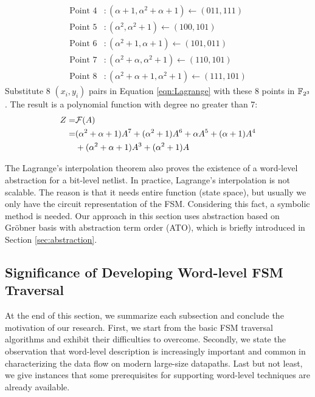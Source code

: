 \begin{Example}
\begin{align*}
\text{Point }4&:  (\alpha + 1,\alpha^2 + \alpha + 1)\gets (011,111) \\
\text{Point }5&:  (\alpha^2,\alpha^2+1) \gets (100,101)\\
\text{Point }6&:  (\alpha^2 + 1,\alpha+1)\gets (101,011)\\
\text{Point }7&:  (\alpha^2 + \alpha,\alpha^2 + 1)\gets (110,101)\\
\text{Point }8&:  (\alpha^2 + \alpha + 1,\alpha^2 + 1)\gets (111,101)
\end{align*}
Substitute 8 $(x_i,y_i)$ pairs in Equation \ref{eqn:Lagrange} with these 8 points in ${\mathbb{F}}_{2^3}$.
The result is a polynomial function with degree no greater than 7:
\begin{align*}
Z =& {\mathcal{F}}(A) \\
=& (\alpha^2+\alpha+1) A^7 + (\alpha^2+1) A^6 + \alpha A^5 + (\alpha+1) A^4 \\
&+ (\alpha^2+\alpha+1)A^3+ (\alpha^2+1)A
\end{align*}

\end{Example}

The Lagrange's interpolation theorem also proves the existence of a word-level abstraction for a bit-level netlist.
In practice, Lagrange's interpolation is not scalable. 
The reason is that it needs entire function (state space), but usually we only have the circuit representation
of the FSM. Considering this fact, a symbolic method is needed.
Our approach in this section uses abstraction based on 
Gr\"obner basis with abstraction term order (ATO), which is briefly introduced in Section \ref{sec:abstraction}.

\subsection{Significance of Developing Word-level FSM Traversal}
At the end of this section, we summarize each subsection and conclude the motivation of our research.
First, we start from the basic FSM traversal algorithms and exhibit their
difficulties to overcome. Secondly, we state the observation that word-level description is 
increasingly important and common in characterizing the data flow on modern large-size datapaths. 
Last but not least, we give instances that some prerequisites for supporting word-level techniques 
are already available. 

